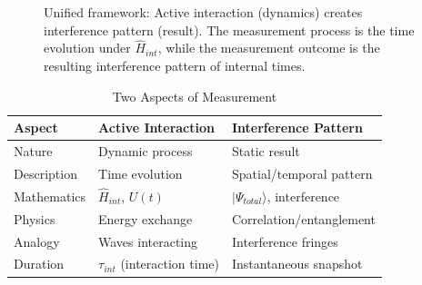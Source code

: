 \begin{figure}[htbp]
\centering
{}
\caption{Unified framework: Active interaction (dynamics) creates interference pattern (result). The measurement process is the time evolution under $\hat{H}_{int}$, while the measurement outcome is the resulting interference pattern of internal times.}
\label{fig:unified_measurement}
\end{figure}

\begin{table}[htbp]
\centering
\caption{Two Aspects of Measurement}
\begin{tabular}{@{}lll@{}}
\toprule
\textbf{Aspect} & \textbf{Active Interaction} & \textbf{Interference Pattern} \\
\midrule
Nature & Dynamic process & Static result \\
Description & Time evolution & Spatial/temporal pattern \\
Mathematics & $\hat{H}_{int}$, $U(t)$ & $|\Psi_{total}\rangle$, interference \\
Physics & Energy exchange & Correlation/entanglement \\
Analogy & Waves interacting & Interference fringes \\
Duration & $\tau_{int}$ (interaction time) & Instantaneous snapshot \\
\bottomrule
\end{tabular}
\label{tab:measurement_aspects}
\end{table}

